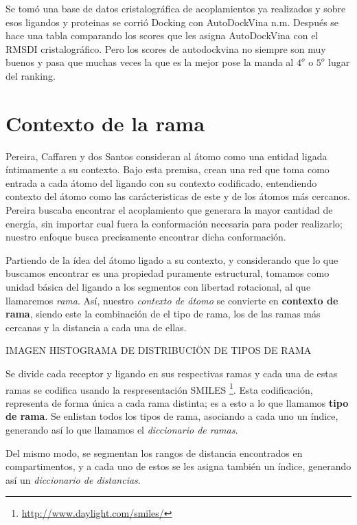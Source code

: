 Se tomó una base de datos cristalográfica de acoplamientos ya
realizados y sobre esos ligandos y proteinas se corrió Docking con
AutoDockVina n.m. Después se hace una tabla comparando los scores que
les asigna AutoDockVina con el RMSDI cristalográfico. Pero los scores
de autodockvina no siempre son muy buenos y pasa que muchas veces la
que es la mejor pose la manda al $4^o$ o $5^o$ lugar del ranking.

\section{Contexto de la rama}
Pereira, Caffaren y dos Santos \cite{dossantos} consideran al átomo
como una entidad ligada íntimamente a su contexto. Bajo esta premisa,
crean una red que toma como entrada a cada átomo del ligando con su
contexto codificado, entendiendo contexto del átomo como las
carácteristicas de este y de los átomos más cercanos.
Pereira buscaba encontrar el acoplamiento que generara la mayor
cantidad de energía, sin importar cual fuera la conformación necesaria
para poder realizarlo; nuestro enfoque busca precisamente encontrar
dicha conformación.

Partiendo de la ídea del átomo ligado a su contexto, y considerando
que lo que buscamos encontrar es una propiedad puramente estructural,
tomamos como unidad básica del ligando a los segmentos con libertad
rotacional, al que llamaremos \textit{rama}. Así, nuestro
\textit{contexto de átomo} se convierte en \textbf{contexto de rama},
siendo este la combinación de el tipo de rama, los de las ramas más
cercanas y la distancia a cada una de ellas.

IMAGEN HISTOGRAMA DE DISTRIBUCIÖN DE TIPOS DE RAMA

Se divide cada receptor y ligando en sus respectivas ramas y cada una
de estas ramas se codifica usando la respresentación
SMILES \footnote{\url{http://www.daylight.com/smiles/}}. Esta
codificación, representa de forma única a cada rama distinta; es a
esto a lo que llamamos \textbf{tipo de rama}. Se enlistan todos los
tipos de rama, asociando a cada uno un índice, generando así lo que
llamamos el \textit{diccionario de ramas}.

Del mismo modo, se segmentan los rangos de distancia encontrados en
compartimentos, y a cada uno de estos se les asigna también un índice,
generando así un \textit{diccionario de distancias}.

